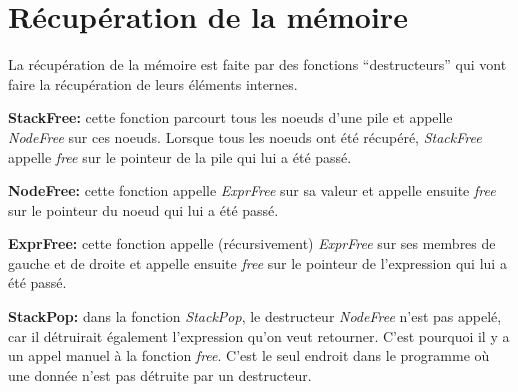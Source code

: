 \documentclass[10pt]{report}
\begin{document}
\section{Récupération de la mémoire}

La récupération de la mémoire est faite par des fonctions
``destructeurs'' qui vont faire la récupération de leurs éléments
internes.

\textbf{StackFree:} cette fonction parcourt tous les noeuds d'une pile
et appelle \emph{NodeFree} sur ces noeuds.  Lorsque tous les noeuds
ont été récupéré, \emph{StackFree} appelle \emph{free} sur le pointeur
de la pile qui lui a été passé.

\textbf{NodeFree:} cette fonction appelle \emph{ExprFree} sur sa
valeur et appelle ensuite \emph{free} sur le pointeur du noeud qui lui
a été passé.

\textbf{ExprFree:} cette fonction appelle (récursivement)
\emph{ExprFree} sur ses membres de gauche et de droite et appelle
ensuite \emph{free} sur le pointeur de l'expression qui lui a été
passé.

\textbf{StackPop:} dans la fonction \emph{StackPop}, le destructeur
\emph{NodeFree} n'est pas appelé, car il détruirait également
l'expression qu'on veut retourner.  C'est pourquoi il y a un appel
manuel à la fonction \emph{free}.  C'est le seul endroit dans le
programme où une donnée n'est pas détruite par un destructeur.
\end{document}
